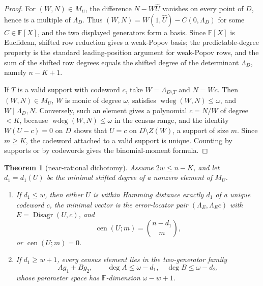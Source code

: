 \documentclass[11pt]{article}
\newtheorem{theorem}{Theorem}[section]
\theoremstyle{definition}
\theoremstyle{remark}
\newcommand{\F}{\mathbb{F}}
\providecommand{\Cen}{\operatorname{cen}}
\providecommand{\wdeg}{\operatorname{wdeg}}
\begin{document}
\begin{proof}
For \((W,N)\in M_U\), the difference \(N-W\widehat U\) vanishes on every point of \(D\), hence is a multiple of \(\Lambda_D\).  Thus \((W,N)=W(1,\widehat U)-C(0,\Lambda_D)\) for some \(C\in\F[X]\), and the two displayed generators form a basis.  Since \(\F[X]\) is Euclidean, shifted row reduction gives a weak-Popov basis; the predictable-degree property is the standard leading-position argument for weak-Popov rows, and the sum of the shifted row degrees equals the shifted degree of the determinant \(\Lambda_D\), namely \(n-K+1\).

If \(T\) is a valid support with codeword \(c\), take \(W=\Lambda_{D\setminus T}\) and \(N=Wc\).  Then \((W,N)\in M_U\), \(W\) is monic of degree \(\omega\), satisfies \(\wdeg(W,N)\le\omega\), and \(W\mid\Lambda_D,N\).  Conversely, such an element gives a polynomial \(c=N/W\) of degree \(<K\), because \(\wdeg(W,N)\le\omega\) in the census range, and the identity \(W(U-c)=0\) on \(D\) shows that \(U=c\) on \(D\setminus Z(W)\), a support of size \(m\).  Since \(m\ge K\), the codeword attached to a valid support is unique.  Counting by supports or by codewords gives the binomial-moment formula.
\end{proof}

\begin{theorem}[near-rational dichotomy]\label{thm:capfr1-near-rational-dichotomy}
Assume \(2w\le n-K\), and let \(d_1=d_1(U)\) be the minimal shifted degree of a nonzero element of \(M_U\).
\begin{enumerate}[label=\textup{(\roman*)}]
\item If \(d_1\le w\), then either \(U\) is within Hamming distance exactly \(d_1\) of a unique codeword \(c\), the minimal vector is the error-locator pair \((\Lambda_E,\Lambda_Ec)\) with \(E=\operatorname{Disagr}(U,c)\), and
\[
        \Cen(U;m)=\binom{n-d_1}{m},
\]
or \(\Cen(U;m)=0\).
\item If \(d_1\ge w+1\), every census element lies in the two-generator family
\[
        Ag_1+Bg_2,
        \qquad
        \deg A\le \omega-d_1,\quad \deg B\le \omega-d_2,
\]
whose parameter space has \(\F\)-dimension \(\omega-w+1\).
\end{enumerate}
\end{theorem}
\end{document}
